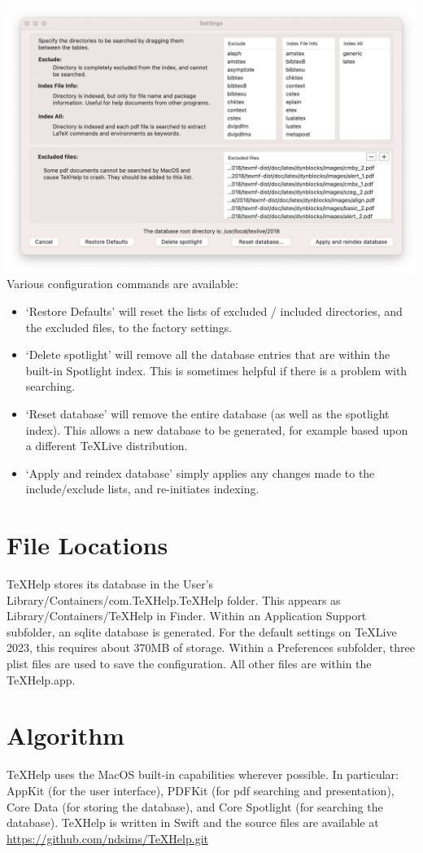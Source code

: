 \documentclass[11pt,a4paper]{article}
\begin{document}
\includegraphics[scale=0.2]{Settings.jpg}
\newpage
Various configuration commands are available:
\begin{itemize}
\item `Restore Defaults' will reset the lists of excluded / included directories, and the excluded files, to the factory settings. 
\item `Delete spotlight' will remove all the database entries that are within the built-in Spotlight index. This is sometimes helpful if there is a problem with searching.
\item `Reset database' will remove the entire database (as well as the spotlight index). This allows a new database to be generated, for example based upon a different \TeX Live distribution.
\item `Apply and reindex database' simply applies any changes made to the include/exclude lists, and re-initiates indexing.
\end{itemize}

\section{File Locations}

\TeX Help stores its database in the User's Library/Containers/com.TeXHelp.TeXHelp folder. This appears as Library/Containers/TeXHelp in Finder. Within an Application Support subfolder, an sqlite database is generated. For the default settings on \TeX Live 2023, this requires about 370MB of storage. Within a Preferences subfolder, three plist files are used to save the configuration. All other files are within the TeXHelp.app. 

\section{Algorithm}
\TeX Help uses the MacOS built-in capabilities wherever possible. In particular: AppKit (for the user interface), PDFKit (for pdf searching and presentation), Core Data (for storing the database), and Core Spotlight (for searching the database). \TeX Help is written in Swift and the source files are available at \url{https://github.com/ndsims/TeXHelp.git}
\end{document}
